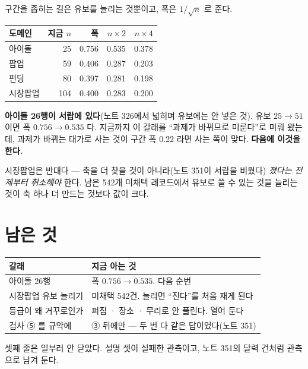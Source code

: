 \documentclass[11pt]{article}
\begin{document}
구간을 좁히는 길은 유보를 늘리는 것뿐이고, 폭은 $1/\sqrt{n}$ 로 준다.

\begin{center}
\begin{tabular}{lrrrr}
\hline
도메인 & 지금 $n$ & 폭 & $n\times2$ & $n\times4$ \\
\hline
아이돌   &  25 & 0.756 & 0.535 & 0.378 \\
팝업     &  59 & 0.406 & 0.287 & 0.203 \\
펀딩     &  80 & 0.397 & 0.281 & 0.198 \\
시장팝업 & 104 & 0.400 & 0.283 & 0.200 \\
\hline
\end{tabular}
\end{center}

\textbf{아이돌 26행이 서랍에 있다}(노트 326에서 넓히며 유보에는 안 넣은
것). 유보 $25\to51$ 이면 폭 $0.756\to0.535$ 다. 지금까지 이 갈래를
``과제가 바뀌므로 미룬다''로 미뤄 왔는데, 과제가 바뀌는 대가로 사는 것이
구간 폭 0.22 라면 사는 쪽이 맞다. \textbf{다음에 이것을 한다.}

시장팝업은 반대다 --- 축을 더 찾을 것이 아니라(노트 351이 서랍을 비웠다)
\emph{졌다는 전제부터 취소해야} 한다. 남은 542개 미채택 레코드에서
유보로 쓸 수 있는 것을 늘리는 것이 축 하나 더 만드는 것보다 값이 크다.

\section{남은 것}

\begin{center}
\begin{tabular}{ll}
\hline
갈래 & 지금 아는 것 \\
\hline
아이돌 26행 & 폭 $0.756\to0.535$. 다음 순번 \\
시장팝업 유보 늘리기 & 미채택 542건. 늘리면 ``진다''를 처음 재게 된다 \\
등급이 왜 거꾸로인가 & 퍼짐 · 장소 · 무리로 안 풀린다. 열어 둔다 \\
검사 ⑤ 를 규약에 & ③ 뒤에만 --- 두 번 다 같은 답이었다(노트 351) \\
\hline
\end{tabular}
\end{center}

셋째 줄은 일부러 안 닫았다. 설명 셋이 실패한 관측이고, 노트 351의 달력
건처럼 관측으로 남겨 둔다.
\end{document}
